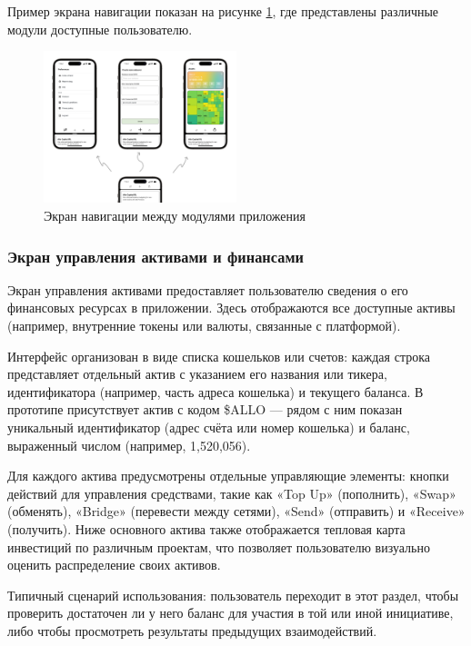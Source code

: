 \documentclass[
    candidate, %
    subf, %
    dotsinheaders=false,
]{disser}
\begin{document}
Пример экрана навигации показан на рисунке \ref{fig:app-navigation}, где представлены различные модули доступные пользователю.

\begin{figure}[h]
  \centering
  \includegraphics[width=0.5\textwidth]{./assets/app-navigation.png}
  \caption{Экран навигации между модулями приложения}
  \label{fig:app-navigation}
\end{figure}

\subsubsection{Экран управления активами и финансами}

Экран управления активами предоставляет пользователю сведения о его финансовых ресурсах в приложении. Здесь отображаются все доступные активы (например, внутренние токены или валюты, связанные с платформой).

Интерфейс организован в виде списка кошельков или счетов: каждая строка представляет отдельный актив с указанием его названия или тикера, идентификатора (например, часть адреса кошелька) и текущего баланса. В прототипе присутствует актив с кодом \$ALLO — рядом с ним показан уникальный идентификатор (адрес счёта или номер кошелька) и баланс, выраженный числом (например, 1,520,056).

Для каждого актива предусмотрены отдельные управляющие элементы: кнопки действий для управления средствами, такие как «Top Up» (пополнить), «Swap» (обменять), «Bridge» (перевести между сетями), «Send» (отправить) и «Receive» (получить). Ниже основного актива также отображается тепловая карта инвестиций по различным проектам, что позволяет пользователю визуально оценить распределение своих активов.

Типичный сценарий использования: пользователь переходит в этот раздел, чтобы проверить достаточен ли у него баланс для участия в той или иной инициативе, либо чтобы просмотреть результаты предыдущих взаимодействий.
\end{document}
